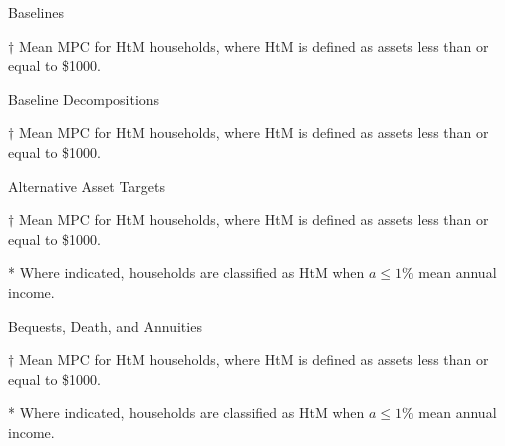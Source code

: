 \documentclass[9pt]{extarticle}
\begin{document}
\begin{table}[h]
\caption{Baselines}
\begin{threeparttable}
\centering


\begin{tablenotes}
	\item[$\dagger$] Mean MPC for HtM households, where HtM is defined as assets less than or equal to \$1000.
\end{tablenotes}
\end{threeparttable}
\end{table}

\begin{table}[h]
\caption{Baseline Decompositions}
\begin{threeparttable}
\centering


\begin{tablenotes}
	\item[$\dagger$] Mean MPC for HtM households, where HtM is defined as assets less than or equal to \$1000.
\end{tablenotes}
\end{threeparttable}
\end{table}

\clearpage

\begin{table}[h]
\caption{Alternative Asset Targets}
\begin{threeparttable}
\centering


\begin{tablenotes}
	\item[$\dagger$] Mean MPC for HtM households, where HtM is defined as assets less than or equal to \$1000.
	\item[*] Where indicated, households are classified as HtM when $a \leq 1\%$ mean annual income.
\end{tablenotes}
\end{threeparttable}
\end{table}

\begin{table}[h]
\caption{Bequests, Death, and Annuities}
\begin{threeparttable}
\centering


\begin{tablenotes}
	\item[$\dagger$] Mean MPC for HtM households, where HtM is defined as assets less than or equal to \$1000.
	\item[*] Where indicated, households are classified as HtM when $a \leq 1\%$ mean annual income.
\end{tablenotes}
\end{threeparttable}
\end{table}
\end{document}
